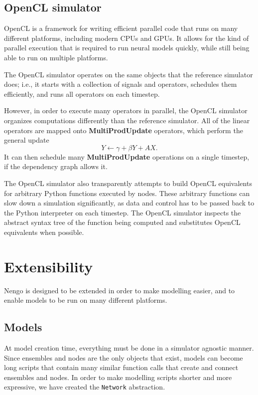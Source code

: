\documentclass{frontiersSCNS}
\begin{document}
\subsection{OpenCL simulator}

OpenCL is a framework for writing
efficient parallel code that runs
on many different platforms,
including modern CPUs and GPUs.
It allows for the kind of parallel execution
that is required to run neural models quickly,
while still being able to run
on multiple platforms.

The OpenCL simulator operates on
the same objects that the reference simulator does;
i.e., it starts with a collection
of signals and operators,
schedules them efficiently,
and runs all operators on each timestep.

However, in order to execute
many operators in parallel,
the OpenCL simulator
organizes computations
differently than the reference simulator.
All of the linear operators are mapped
onto \textbf{MultiProdUpdate} operators,
which perform the general update
$$Y \leftarrow \gamma + \beta Y + AX.$$
It can then schedule many
\textbf{MultiProdUpdate} operations
on a single timestep,
if the dependency graph allows it.

The OpenCL simulator also transparently
attempts to build OpenCL equivalents
for arbitrary Python functions
executed by nodes.
These arbitrary functions
can slow down a simulation significantly,
as data and control has to be passed back
to the Python interpreter
on each timestep.
The OpenCL simulator inspects
the abstract syntax tree
of the function being computed
and substitutes OpenCL equivalents when possible.

\section{Extensibility}

Nengo is designed to be extended
in order to make modelling easier,
and to enable models to be run
on many different platforms.

\subsection{Models}

At model creation time,
everything must be done
in a simulator agnostic manner.
Since ensembles and nodes
are the only objects that exist,
models can become long scripts
that contain many
similar function calls that
create and connect ensembles and nodes.
In order to make modelling scripts
shorter and more expressive,
we have created the \texttt{Network} abstraction.
\end{document}
